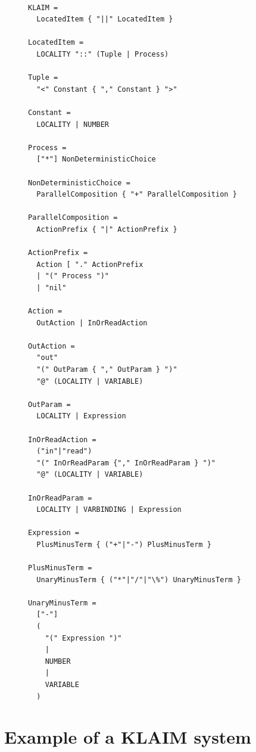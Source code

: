	\begin{figure}
\lstset{showtabs=false,showspaces=false,showstringspaces=false}
\begin{lstlisting}[caption=EBNF Productions of KLAIM,frame=trbl,label=lst:klaim_ebnf,basicstyle=\scriptsize\ttfamily,showtabs=false,showspaces=false]

KLAIM = 
  LocatedItem { "||" LocatedItem }                

LocatedItem = 
  LOCALITY "::" (Tuple | Process)

Tuple = 
  "<" Constant { "," Constant } ">"

Constant = 
  LOCALITY | NUMBER

Process = 
  ["*"] NonDeterministicChoice

NonDeterministicChoice =  
  ParallelComposition { "+" ParallelComposition }

ParallelComposition = 
  ActionPrefix { "|" ActionPrefix }

ActionPrefix = 
  Action [ "." ActionPrefix
  | "(" Process ")"  
  | "nil"

Action = 
  OutAction | InOrReadAction

OutAction = 
  "out" 
  "(" OutParam { "," OutParam } ")" 
  "@" (LOCALITY | VARIABLE)

OutParam = 
  LOCALITY | Expression

InOrReadAction = 
  ("in"|"read") 
  "(" InOrReadParam {"," InOrReadParam } ")" 
  "@" (LOCALITY | VARIABLE)

InOrReadParam = 
  LOCALITY | VARBINDING | Expression

Expression = 
  PlusMinusTerm { ("+"|"-") PlusMinusTerm }

PlusMinusTerm = 
  UnaryMinusTerm { ("*"|"/"|"\%") UnaryMinusTerm }

UnaryMinusTerm = 
  ["-"] 
  ( 
    "(" Expression ")" 
    | 
    NUMBER 
    | 
    VARIABLE 
  )

	\end{lstlisting}
	\end{figure}


\section{Example of a  KLAIM system}
  
